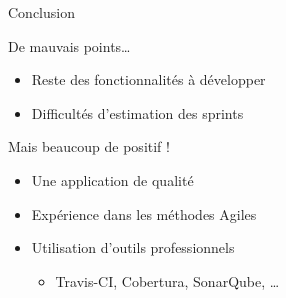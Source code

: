 \AntoineSpeak
\begin{frame}{Conclusion}
	\begin{alertblock}{De mauvais points\ldots}
		\begin{itemize}
			\item Reste des fonctionnalités à développer
			\item Difficultés d'estimation des sprints
		\end{itemize}
	\end{alertblock}
	\vfill
	\begin{exampleblock}{Mais beaucoup de positif !}
		\begin{itemize}
			\item Une application de qualité
			\item Expérience dans les méthodes Agiles
			\item Utilisation d'outils professionnels
			\begin{itemize}
				\item Travis-CI, Cobertura, SonarQube, \ldots
			\end{itemize}
		\end{itemize}
	\end{exampleblock}
\end{frame}
